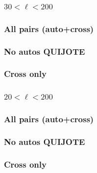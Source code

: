 \clearpage

\subsubsection*{$30 < \ell < 200$}

\subsubsection*{All pairs (auto+cross)}



\subsubsection*{No autos QUIJOTE}




\subsubsection*{Cross only}




\clearpage

\subsubsection*{$20 < \ell < 200$}

\subsubsection*{All pairs (auto+cross)}



\subsubsection*{No autos QUIJOTE}



\subsubsection*{Cross only}

